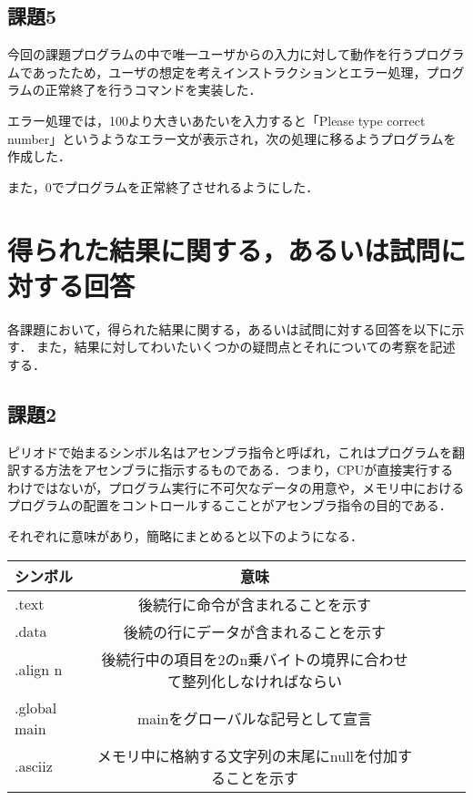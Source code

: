 \documentclass[a4j]{jarticle}
\begin{document}
\subsection{課題5}

今回の課題プログラムの中で唯一ユーザからの入力に対して動作を行うプログラムであったため，ユーザの想定を考えインストラクションとエラー処理，プログラムの正常終了を行うコマンドを実装した．

エラー処理では，100より大きいあたいを入力すると「Please type correct number」というようなエラー文が表示され，次の処理に移るようプログラムを作成した．

また，0でプログラムを正常終了させれるようにした．





%
%

\section{得られた結果に関する，あるいは試問に対する回答}


各課題において，得られた結果に関する，あるいは試問に対する回答を以下に示す．
また，結果に対してわいたいくつかの疑問点とそれについての考察を記述する．


\subsection{課題2}

ピリオドで始まるシンボル名はアセンブラ指令と呼ばれ，これはプログラムを翻訳する方法をアセンブラに指示するものである．つまり，CPUが直接実行するわけではないが，プログラム実行に不可欠なデータの用意や，メモリ中におけるプログラムの配置をコントロールするこことがアセンブラ指令の目的である．

それぞれに意味があり，簡略にまとめると以下のようになる．

\begin{center}
\begin{tabular}{lclcl}\hline
シンボル&意味\\ \hline \hline
.text&後続行に命令が含まれることを示す\\ \hline
.data&後続の行にデータが含まれることを示す\\ \hline
.align n&後続行中の項目を2のn乗バイトの境界に合わせて整列化しなければならい\\ \hline
.global main&mainをグローバルな記号として宣言\\ \hline
.asciiz&メモリ中に格納する文字列の末尾にnullを付加することを示す\\ \hline
\end{tabular}
\end{center}
\end{document}
